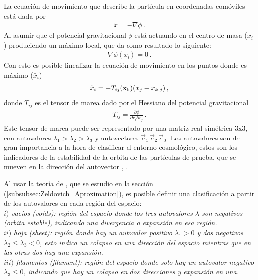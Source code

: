 La ecuación de movimiento que describe la partícula en coordenadas comóviles está dada por 
\begin{align}
    \ddot{x}=-\nabla\phi\,.
\end{align}
%
Al asumir que el potencial gravitacional $\phi$ está actuando en el centro de masa ($\bar{x}_{i}$) produciendo un máximo local, que da como resultado lo siguiente:
%
\begin{align}
    \nabla\phi(\bar{x}_{i})=0\,.
\end{align}
%
Con esto es posible linealizar la ecuación de movimiento en los puntos donde es máximo ($\bar{x}_{i}$)
%
\begin{align}
    \ddot{x}_{i}=-T_{ij}({\bf{\bar{x}}_{k}})(x_{j}-\bar{x}_{k,j})\,,
\end{align}
%
donde $T_{ij}$ es el tensor de marea dado por el Hessiano del potencial gravitacional
%
\begin{align}
    T_{ij}=\frac{\partial \phi}{\partial r_{i} \partial r_{j}}\,.
\end{align}
%
Este tensor de marea puede ser representado por una matriz real simétrica 3x3, con autovalores $\lambda_{1}>\lambda_{2}>\lambda_{3}$ y  autovectores $\vec{e}_{1}\, \vec{e}_{2}\, \vec{e}_{3}$. Los autovalores son de gran importancia a la hora de clasificar el entorno cosmológico, estos son los indicadores de la estabilidad de la orbita de las partículas de prueba, que se mueven en la dirección del autovector \cite{padmanabhan1995}, \cite{hahn2007}.

Al usar la teoría de \cite{zeldovich1970}, que se estudio en la sección (\ref{subsubsec:Zeldovich_Aproximation}), es posible definir una clasificación a partir de los autovalores en cada región del espacio:\\

$i)$ {\it{vacíos (voids)}: región del espacio donde los tres autovalores $\lambda$ son negativos (orbita estable), indicando una divergencia o expansión en esa región.}\\

$ii)$ {\it{hoja (sheet)}: región donde hay un autovalor positivo $\lambda_{1}>0$ y dos negativos $\lambda_{2} \leq \lambda_{3}< 0$, esto indica un colapso en una dirección del espacio mientras que en las otras dos hay una expansión.}\\

$iii)$ {\it{filamentos (filament)}: región del espacio donde solo hay un autovalor negativo $\lambda_{3}\leq 0$, indicando que hay un colapso en dos direcciones y expansión en una.} \\

